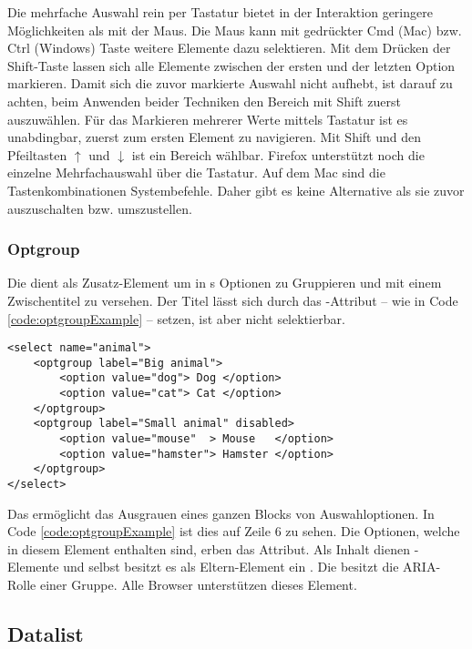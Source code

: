 Die mehrfache Auswahl rein per Tastatur bietet in der Interaktion geringere Möglichkeiten als mit der Maus.
Die Maus kann mit gedrückter Cmd (Mac) bzw. Ctrl (Windows) Taste weitere Elemente dazu selektieren.
Mit dem Drücken der Shift-Taste lassen sich alle Elemente zwischen der ersten und der letzten Option markieren.
Damit sich die zuvor markierte Auswahl nicht aufhebt, ist darauf zu achten, beim Anwenden beider Techniken den Bereich mit Shift zuerst auszuwählen.
Für das Markieren mehrerer Werte mittels Tastatur ist es unabdingbar, zuerst zum ersten Element zu navigieren.
Mit Shift und den Pfeiltasten $\uparrow$ und $\downarrow$ ist ein Bereich wählbar.
Firefox unterstützt noch die einzelne Mehrfachauswahl über die Tastatur.
Auf dem Mac sind die Tastenkombinationen Systembefehle.
Daher gibt es keine Alternative als sie zuvor auszuschalten bzw. umszustellen.


\subsubsection{\color{dgray} Optgroup}
\label{sec:optgroup}

Die  dient als Zusatz-Element um in s Optionen zu Gruppieren und mit einem Zwischentitel zu versehen.
Der Titel lässt sich durch das -Attribut – wie in Code \ref{code:optgroupExample} – setzen, ist aber nicht selektierbar. 

\begin{lstlisting}[style = htmlcssjs, caption = Optgroup Beispiel, label = code:optgroupExample]
<select name="animal">
    <optgroup label="Big animal">
        <option value="dog"> Dog </option>
        <option value="cat"> Cat </option>
    </optgroup>
    <optgroup label="Small animal" disabled>
        <option value="mouse"  > Mouse   </option>
        <option value="hamster"> Hamster </option>
    </optgroup>
</select>
\end{lstlisting}

Das  ermöglicht das Ausgrauen eines ganzen Blocks von Auswahloptionen.
In Code \ref{code:optgroupExample} ist dies auf Zeile 6 zu sehen.
Die Optionen, welche in diesem Element enthalten sind, erben das Attribut.
Als Inhalt dienen -Elemente und selbst besitzt es als Eltern-Element ein .
Die  besitzt die ARIA-Rolle einer Gruppe.
Alle Browser unterstützen dieses Element.


\subsection{Datalist}
\label{sec:datalist}

